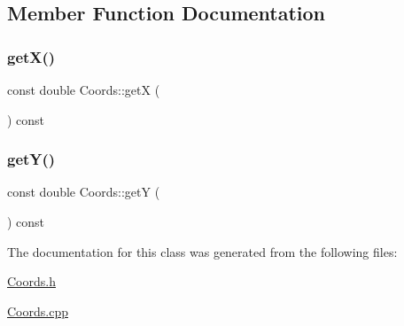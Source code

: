 \subsection{Member Function Documentation}
\mbox{\label{class_coords_ace1df844690c765993d4aab4444dc3bb}} 
\subsubsection{\texorpdfstring{getX()}{getX()}}
{\footnotesize\ttfamily const double Coords\+::getX (\begin{DoxyParamCaption}{ }\end{DoxyParamCaption}) const}

\mbox{\label{class_coords_a97ee10f1880dca8a6139ab69e822d26f}} 
\subsubsection{\texorpdfstring{getY()}{getY()}}
{\footnotesize\ttfamily const double Coords\+::getY (\begin{DoxyParamCaption}{ }\end{DoxyParamCaption}) const}



The documentation for this class was generated from the following files\+:\begin{DoxyCompactItemize}
\item 
\mbox{\hyperlink{_coords_8h}{Coords.\+h}}\item 
\mbox{\hyperlink{_coords_8cpp}{Coords.\+cpp}}\end{DoxyCompactItemize}
